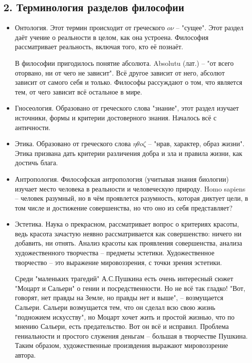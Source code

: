 \documentclass[a4paper, 12pt]{article} %
\begin{document}
\subsection*{2. Терминология разделов философии}
\begin{itemize}
\item Онтология.
Этот термин происходит от греческого $o \nu$ -- "сущее". Этот раздел даёт учение о реальности в целом, как она устроена. Философия рассматривает реальность, включая того, кто её познаёт.
 
В философии пригодилось понятие абсолюта. Absolutu (лат.) -- "от всего оторвано, ни от чего не зависит". Всё другое зависит от него, абсолют зависит от самого себя и  только. Философы рассуждают о том, что является тем, от чего зависит всё остальное в мире.

\item Гносеология. Образовано от греческого слова "знание", этот раздел изучает источники, формы и критерии достоверного знания. Началось всё с античности. 

\item Этика. Образовано от греческого слова $\eta \theta o \zeta$ -- "нрав, характер, образ жизни". Этика призвана дать критерии различения добра и зла и правила жизни, как достичь блага.

\item Антропология. Философская антропология (учитывая знания биологии) изучает место человека в реальности и человеческую природу. Homo sapiens -- человек разумный, но в чём проявлется разумность, которая диктует цели, в том числе и достижение совершенства, но что оно из себя представляет?

\item Эстетика. Наука о прекрасном, рассматривает вопрос о критериях красоты, ведь красота зачастую неявно рассматривается как совершенство: ничего ни добавить, ни отнять. Анализ красоты как проявления совершенства, анализа художественного творчества -- предметы эстетики. Художественное творчество -- это выражение мировоззрения, с точки зрения эстетики. 	

Среди "маленьких трагедий" А.С.Пушкина есть очень интересный сюжет "Моцарт и Сальери" о гении и посредственности. Но не всё так гладко! "Вот, говорят, нет правды на Земле,  но правды нет и выше", -- возмущается Сальери. Сальери возмущается тем, что он сделал всю свою жизнь "подножием искусству", но Моцарт хочет жить и простой жизнью, что по мнению Сальери, есть предательство. Вот он всё и исправил. Проблема гениальности и простого служения деньгам -- большая в творчестве Пушкина. Таким образом, художественные произвдения выражают мировоззрение автора.


\end{itemize}
\end{document}
